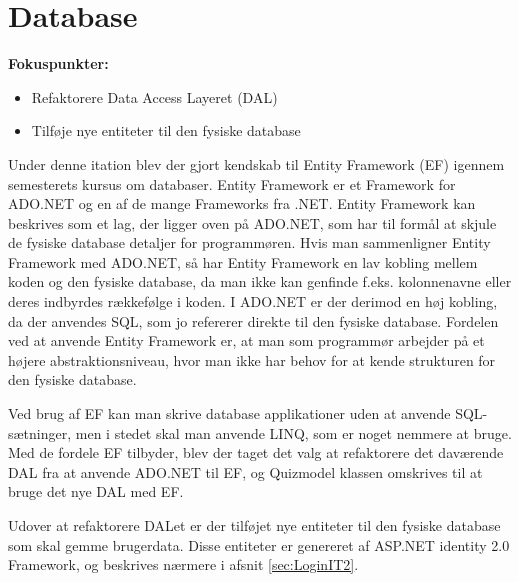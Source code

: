 \section{Database}

\textbf{Fokuspunkter:}
	\begin{itemize}
			\item Refaktorere Data Access Layeret (DAL)
			\item Tilføje nye entiteter til den fysiske database
	\end{itemize}


Under denne itation blev der gjort kendskab til Entity Framework (EF) igennem semesterets kursus om databaser. Entity Framework er et Framework for ADO.NET og en af de mange Frameworks fra .NET. Entity Framework kan beskrives som et lag, der ligger oven på ADO.NET, som har til formål at skjule de fysiske database detaljer for programmøren. Hvis man sammenligner Entity Framework med ADO.NET, så har Entity Framework en lav kobling mellem koden og den fysiske database, da man ikke kan genfinde f.eks. kolonnenavne eller deres indbyrdes rækkefølge i koden. I ADO.NET er der derimod en høj kobling, da der anvendes SQL, som jo refererer direkte til den fysiske database. Fordelen ved at anvende Entity Framework er, at man som programmør arbejder på et højere abstraktionsniveau, hvor man ikke har behov for at kende strukturen for den fysiske database. 

Ved brug af EF kan man skrive database applikationer uden at anvende SQL-sætninger, men i stedet skal man anvende LINQ, som er noget nemmere at bruge. Med de fordele EF tilbyder, blev der taget det valg at refaktorere det daværende DAL fra at anvende ADO.NET til EF, og Quizmodel klassen omskrives til at bruge det nye DAL med EF. 

Udover at refaktorere DALet er der tilføjet nye entiteter til den fysiske database som skal gemme brugerdata. Disse entiteter er genereret af ASP.NET identity 2.0 Framework, og beskrives nærmere i afsnit \ref{sec:LoginIT2}.

